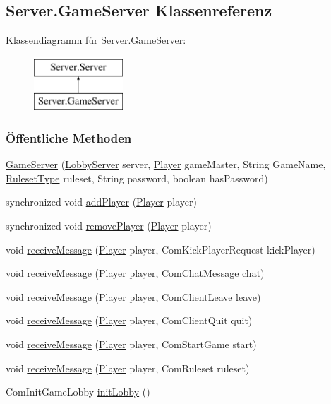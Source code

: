 \hypertarget{a00043}{\subsection{Server.\-Game\-Server Klassenreferenz}
\label{a00043}
}
Klassendiagramm für Server.\-Game\-Server\-:\begin{figure}[H]
\begin{center}
\leavevmode
\includegraphics[height=2.000000cm]{a00043}
\end{center}
\end{figure}
\subsubsection*{Öffentliche Methoden}
\begin{DoxyCompactItemize}
\item 
\hyperlink{a00043_a6db144e60c51cb6ee80f448104127aed}{Game\-Server} (\hyperlink{a00054}{Lobby\-Server} server, \hyperlink{a00073}{Player} game\-Master, String Game\-Name, \hyperlink{a00076}{Ruleset\-Type} ruleset, String password, boolean has\-Password)
\item 
synchronized void \hyperlink{a00043_a942046c7512e4fead06f7df12faa119f}{add\-Player} (\hyperlink{a00073}{Player} player)
\item 
synchronized void \hyperlink{a00043_afc6cc835652484da1b7b1fda6071ea0b}{remove\-Player} (\hyperlink{a00073}{Player} player)
\item 
void \hyperlink{a00043_aae9201e5827933e23b078bc7eaf2aee3}{receive\-Message} (\hyperlink{a00073}{Player} player, Com\-Kick\-Player\-Request kick\-Player)
\item 
void \hyperlink{a00043_a7112c8a4b95e71c42a207b844f447305}{receive\-Message} (\hyperlink{a00073}{Player} player, Com\-Chat\-Message chat)
\item 
void \hyperlink{a00043_a9fd05e79a3ae006b056cb27199ee7aeb}{receive\-Message} (\hyperlink{a00073}{Player} player, Com\-Client\-Leave leave)
\item 
void \hyperlink{a00043_af3affa434fc5afd574d4fa74060ac9c7}{receive\-Message} (\hyperlink{a00073}{Player} player, Com\-Client\-Quit quit)
\item 
void \hyperlink{a00043_accca048ccec6323df6d3262f96d98723}{receive\-Message} (\hyperlink{a00073}{Player} player, Com\-Start\-Game start)
\item 
void \hyperlink{a00043_accad199750d7c6577b2d096483ce6e9d}{receive\-Message} (\hyperlink{a00073}{Player} player, Com\-Ruleset ruleset)
\item 
Com\-Init\-Game\-Lobby \hyperlink{a00043_a4e2b83f3466ec6c9cbe0a24a30587333}{init\-Lobby} ()
\end{DoxyCompactItemize}


